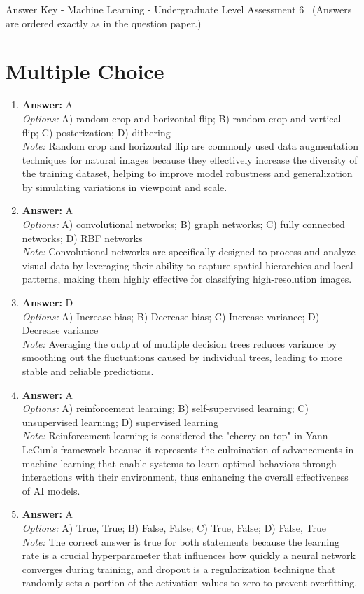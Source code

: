 \documentclass[12pt]{article}
\begin{document}
\begin{center}
Answer Key - Machine Learning - Undergraduate Level Assessment 6 \
\small (Answers are ordered exactly as in the question paper.)
\end{center}

\section*{Multiple Choice}
\begin{enumerate}[label=\arabic*.]
\item \textbf{Answer:} A
\\ \textit{Options:} A) random crop and horizontal flip; B) random crop and vertical flip; C) posterization; D) dithering
\\ \textit{Note:} Random crop and horizontal flip are commonly used data augmentation techniques for natural images because they effectively increase the diversity of the training dataset, helping to improve model robustness and generalization by simulating variations in viewpoint and scale.
\item \textbf{Answer:} A
\\ \textit{Options:} A) convolutional networks; B) graph networks; C) fully connected networks; D) RBF networks
\\ \textit{Note:} Convolutional networks are specifically designed to process and analyze visual data by leveraging their ability to capture spatial hierarchies and local patterns, making them highly effective for classifying high-resolution images.
\item \textbf{Answer:} D
\\ \textit{Options:} A) Increase bias; B) Decrease bias; C) Increase variance; D) Decrease variance
\\ \textit{Note:} Averaging the output of multiple decision trees reduces variance by smoothing out the fluctuations caused by individual trees, leading to more stable and reliable predictions.
\item \textbf{Answer:} A
\\ \textit{Options:} A) reinforcement learning; B) self-supervised learning; C) unsupervised learning; D) supervised learning
\\ \textit{Note:} Reinforcement learning is considered the "cherry on top" in Yann LeCun's framework because it represents the culmination of advancements in machine learning that enable systems to learn optimal behaviors through interactions with their environment, thus enhancing the overall effectiveness of AI models.
\item \textbf{Answer:} A
\\ \textit{Options:} A) True, True; B) False, False; C) True, False; D) False, True
\\ \textit{Note:} The correct answer is true for both statements because the learning rate is a crucial hyperparameter that influences how quickly a neural network converges during training, and dropout is a regularization technique that randomly sets a portion of the activation values to zero to prevent overfitting.
\end{enumerate}
\end{document}
